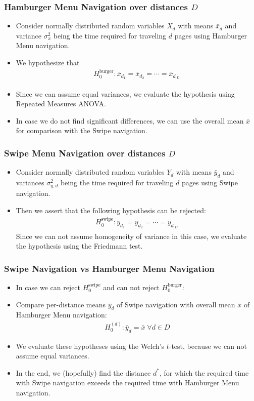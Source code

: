 \documentclass{beamer}
\begin{document}
\begin{frame}
  \frametitle{Hamburger Menu Navigation over distances $D$}
  \begin{itemize}
    \item Consider normally distributed random variables $X_d$ with means $\bar x_d$
      and variance $\sigma_{x}^2$ being the time required for traveling
      $d$ pages using Hamburger Menu navigation.
    \item We hypothesize that
      \begin{align*}
        H_0^\text{burger}: \bar x_{d_1} = \bar x_{d_2} = \cdots = \bar x_{d_{|D|}}
      \end{align*}
    \item Since we can assume equal variances, we evaluate the hypothesis using
      Repeated Measures {ANOVA}.
    \item In case we do not find significant differences, we can use the overall mean
      $\bar x$ for comparison with the Swipe navigation.
  \end{itemize}
\end{frame}

\begin{frame}
  \frametitle{Swipe Menu Navigation over distances $D$}
  \begin{itemize}
    \item  Consider normally
      distributed random variables $Y_d$ with means $\bar y_d$ and variances
      $\sigma_{y,d}^2$ being the time required for traveling $d$ pages using
      Swipe navigation.
    \item Then we assert that the following hypothesis can be rejected:
      \begin{align*}
        H_0^\text{swipe}: \bar y_{d_1} = \bar y_{d_2} = \cdots = \bar y_{d_{|D|}}
      \end{align*}
      Since we can not assume homogeneity of variance in this case,
      we evaluate the hypothesis using the Friedmann test.
  \end{itemize}
\end{frame}

\begin{frame}
  \frametitle{Swipe Navigation vs Hamburger Menu Navigation}
  \begin{itemize}
    \item In case we can reject $H_0^\text{swipe}$ and can not reject $H_0^\text{burger}$:
    \item Compare per-distance means $\bar y_d$ of Swipe navigation
      with overall mean $\bar x$ of Hamburger Menu navigation:
      \begin{align*}
        H_0^{(d)} : \bar y_d = \bar x \;\forall d \in D
      \end{align*}
    \item We evaluate these hypotheses using the Welch's $t$-test, because we
      can not assume equal variances.
    \item In the end, we (hopefully) find the distance $d^*$, for which the
      required time with Swipe navigation exceeds the required time with
      Hamburger Menu navigation.
  \end{itemize}
\end{frame}
\end{document}
